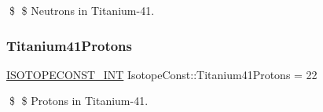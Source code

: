 \$ \$ Neutrons in Titanium-\/41. \mbox{\label{group___isotope_const-_titanium-_ti41_gab93c3ecc6a94269656ac178aeaab5dac}} 
\subsubsection{\texorpdfstring{Titanium41\+Protons}{Titanium41Protons}}
{\footnotesize\ttfamily \mbox{\hyperlink{group___isotope_const-_macros_ga5f18360b3e99483a35c32d789e62621c}{I\+S\+O\+T\+O\+P\+E\+C\+O\+N\+S\+T\+\_\+\+I\+NT}} Isotope\+Const\+::\+Titanium41\+Protons = 22}

\$ \$ Protons in Titanium-\/41. 